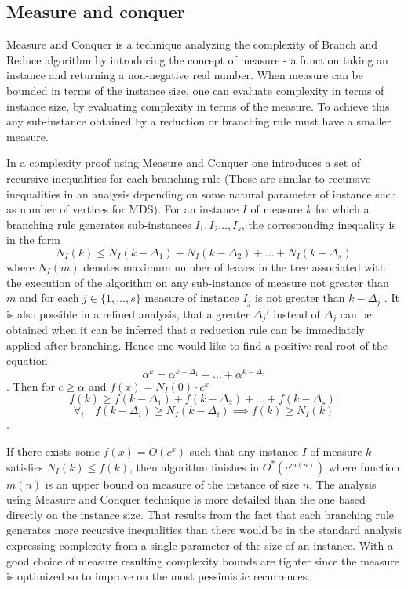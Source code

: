\subsection{Measure and conquer} \label{family_of_recurrences}
Measure and Conquer is a technique analyzing the complexity of Branch and Reduce algorithm by introducing the concept of measure - a function taking an instance and returning a non-negative real number. When measure can be bounded in terms of the instance size, one can evaluate complexity in terms of instance size, by evaluating complexity in terms of the measure. To achieve this any sub-instance obtained by a reduction or branching rule must have a smaller measure.
\par In a complexity proof using Measure and Conquer one introduces a set of recursive inequalities for each branching rule (These are similar to recursive inequalities in an analysis depending on some natural parameter of instance such as number of vertices for MDS). For an instance $I$ of measure $k$ for which a branching rule generates sub-instances $I_1, I_2 \dots, I_s$, the corresponding inequality is in the form
\begin{equation} \label{reccursive_inequality}
    N_I(k) \leq N_I(k - \Delta_1) + N_I(k - \Delta_2) + \dots + N_I(k - \Delta_s)
\end{equation}
where $N_I(m)$ denotes maximum number of leaves in the tree associated with the execution of the algorithm on any sub-instance of measure not greater than $m$ and for each $j \in \{1, \dots, s\}$ measure of instance $I_j$ is not greater than $k - \Delta_j$ \cite{DBLP:journals/eatcs/FominGK05} \cite{VANROOIJ20112147}. It is also possible in a refined analysis, that a greater $\Delta_j'$ instead of $\Delta_j$ can be obtained when it can be inferred that a reduction rule can be immediately applied after branching. Hence one would like to find a positive real root of the equation
\begin{equation} \label{alpha_inequality}
    \alpha^k = \alpha^{k-\Delta_1} + \dots + \alpha^{k-\Delta_s}
\end{equation}
\cite{DBLP:journals/eatcs/FominGK05}. Then for $c\geq\alpha$ and $f(x) = N_I(0)\cdot c^x$
$$
f(k) \geq f(k - \Delta_1) + f(k - \Delta_2) + \dots + f(k - \Delta_s).
$$
$$\forall_i\quad f(k - \Delta_i) \geq N_I(k -\Delta_i) \implies f(k)\geq N_I(k)$$.

If there exists some $f(x) = O(c^x)$ such that any instance $I$ of measure $k$ satisfies $N_I(k) \leq f(k)$, then algorithm finishes in $O^*(c^{m(n)})$ where function $m(n)$ is an upper bound on measure of the instance of size $n$. The analysis using Measure and Conquer technique is more detailed than the one based directly on the instance size. That results from the fact that each branching rule generates more recursive inequalities than there would be in the standard analysis expressing complexity from a single parameter of the size of an instance. With a good choice of measure resulting complexity bounds are tighter since the measure is optimized so to improve on the most pessimistic recurrences.


